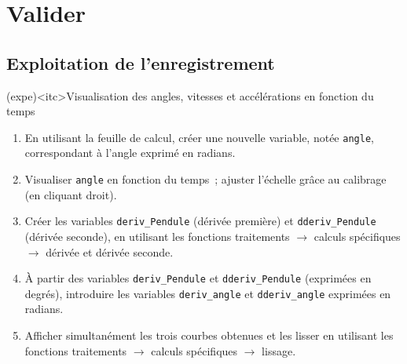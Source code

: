 \documentclass[../main/main.tex]{subfiles}
\begin{document}
\section{Valider}

\subsection{Exploitation de l'enregistrement}

\begin{tcb}(expe)<itc>{Visualisation des angles,
			vitesses et accélérations en fonction du temps}
	\begin{enumerate}
		\item En utilisant la feuille de calcul, créer une nouvelle variable, notée
		      \texttt{angle}, correspondant à l'angle exprimé en radians.
		\item Visualiser \texttt{angle} en fonction du temps~; ajuster l'échelle
		      grâce au calibrage (en cliquant droit).
		\item Créer les variables \texttt{deriv\_Pendule} (dérivée première) et
		      \texttt{dderiv\_Pendule} (dérivée seconde), en utilisant les fonctions
		      traitements $\rightarrow$ calculs spécifiques $\rightarrow$ dérivée et
		      dérivée seconde.
		\item À partir des variables \texttt{deriv\_Pendule} et
		      \texttt{dderiv\_Pendule} (exprimées en degrés), introduire les variables
		      \texttt{deriv\_angle} et \texttt{dderiv\_angle} exprimées en radians.
		\item Afficher simultanément les trois courbes obtenues et les lisser en
		      utilisant les fonctions traitements $\rightarrow$ calculs spécifiques
		      $\rightarrow$ lissage.
	\end{enumerate}
\end{tcb}


\end{document}
